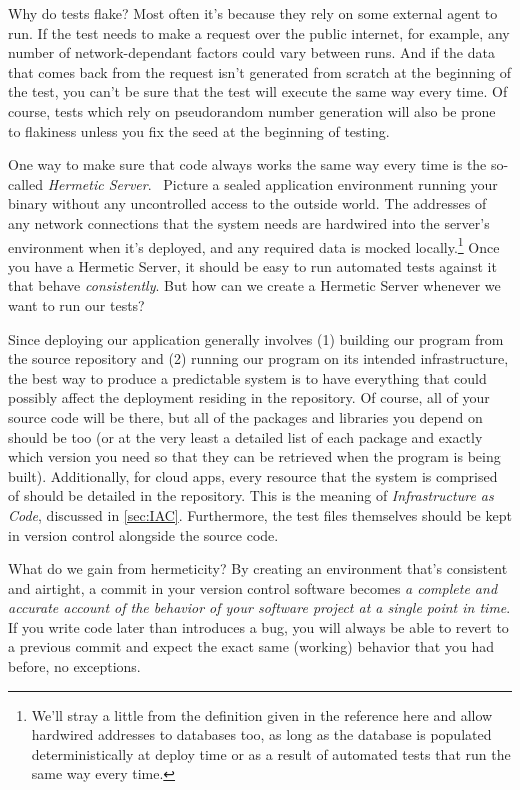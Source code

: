 \documentclass{article}
\newcommand{\noterm}[1]{\textit{#1}}
\newcommand{\term}[1]{\noterm{#1}\index{#1}}
\begin{document}
Why do tests flake?
Most often it's because they rely on some external agent to run.
If the test needs to make a request over the public internet, for example, any number of network-dependant factors could vary between runs.
And if the data that comes back from the request isn't generated from scratch at the beginning of the test, you can't be sure that the test will execute the same way every time.
Of course, tests which rely on pseudorandom number generation will also be prone to flakiness unless you fix the seed at the beginning of testing.

One way to make sure that code always works the same way every time is the so-called \term{Hermetic Server}.~\cite{google-hermetic-servers}
Picture a sealed application environment running your binary without any uncontrolled access to the outside world.
The addresses of any network connections that the system needs are hardwired into the server's environment when it's deployed, and any required data is mocked locally.\footnote{
  We'll stray a little from the definition given in the reference here and allow hardwired addresses to databases too, as long as the database is populated deterministically at deploy time or as a result of automated tests that run the same way every time.
}
Once you have a Hermetic Server, it should be easy to run automated tests against it that behave \term{consistently}.
But how can we create a Hermetic Server whenever we want to run our tests?

Since deploying our application generally involves (1) building our program from the source repository and (2) running our program on its intended infrastructure, the best way to produce a predictable system is to have everything that could possibly affect the deployment residing in the repository.
Of course, all of your source code will be there, but all of the packages and libraries you depend on should be too (or at the very least a detailed list of each package and exactly which version you need so that they can be retrieved when the program is being built).
Additionally, for cloud apps, every resource that the system is comprised of should be detailed in the repository.
This is the meaning of \term{Infrastructure as Code}, discussed in \ref{sec:IAC}.
Furthermore, the test files themselves should be kept in version control alongside the source code.

What do we gain from hermeticity?
By creating an environment that's consistent and airtight, a commit in your version control software becomes \textit{a complete and accurate account of the behavior of your software project at a single point in time}.
If you write code later than introduces a bug, you will always be able to revert to a previous commit and expect the exact same (working) behavior that you had before, no exceptions.
\end{document}
